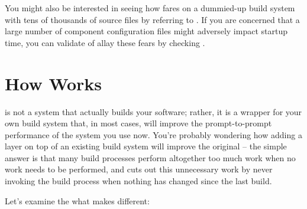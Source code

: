 You might also be interested in seeing how \lmsbw fares on a
dummied-up build system with tens of thousands of source files by
referring to .  If you are concerned that a
large number of component configuration files might adversely impact
startup time, you can validate of allay these fears by checking
.

\section{How \lmsbw Works}

\lmsbw is not a system that actually builds your software; rather, it
is a wrapper for your own build system that, in most cases, will
improve the prompt-to-prompt performance of the system you use now.
You're probably wondering how adding a layer on top of an existing
build system will improve the original -- the simple answer is that
many build processes perform altogether too much work when no work
needs to be performed, and \lmsbw cuts out this unnecessary work by
never invoking the build process when nothing has changed since the
last build.

Let's examine the what makes \lmsbw different:

